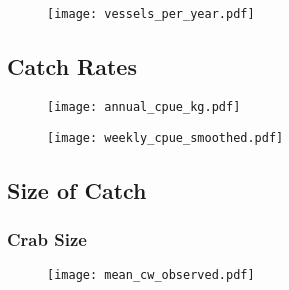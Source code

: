 
\begin{frame}
\begin{figure}

 \centerline{\texttt{[image: vessels\_per\_year.pdf]}}

 \end{figure}
\end{frame}



\subsection{Catch Rates}
\begin{frame}
\begin{figure}

 \vspace*{-.25cm}
 \centerline{\texttt{[image: annual\_cpue\_kg.pdf]}}

 \end{figure}
\end{frame}



\begin{frame}
\begin{figure}

 \vspace*{-.5cm}
 \centerline{\texttt{[image: weekly\_cpue\_smoothed.pdf]}}

 \end{figure}
\end{frame}



\subsection{Size of Catch}
\begin{frame}
\frametitle{Crab Size}
\begin{figure}

 \vspace*{-.5cm}
 \centerline{\texttt{[image: mean\_cw\_observed.pdf]}}

 \end{figure}
\end{frame}

